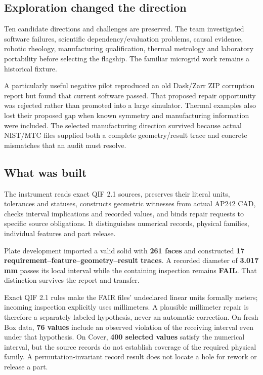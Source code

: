 \documentclass[
  10pt,
]{article}
\let\OriginalSubsection\subsection
\renewcommand{\subsection}{\needspace{6\baselineskip}\OriginalSubsection}
\begin{document}
\hypertarget{exploration-changed-the-direction}{%
\subsection{Exploration changed the
direction}\label{exploration-changed-the-direction}}

Ten candidate directions and challenges are preserved. The team
investigated software failures, scientific dependency/evaluation
problems, causal evidence, robotic rheology, manufacturing
qualification, thermal metrology and laboratory portability before
selecting the flagship. The familiar microgrid work remains a historical
fixture.

A particularly useful negative pilot reproduced an old Dask/Zarr ZIP
corruption report but found that current software passed. That proposed
repair opportunity was rejected rather than promoted into a large
simulator. Thermal examples also lost their proposed gap when known
symmetry and manufacturing information were included. The selected
manufacturing direction survived because actual NIST/MTC files supplied
both a complete geometry/result trace and concrete mismatches that an
audit must resolve.

\hypertarget{what-was-built}{%
\subsection{What was built}\label{what-was-built}}

The instrument reads exact QIF 2.1 sources, preserves their literal
units, tolerances and statuses, constructs geometric witnesses from
actual AP242 CAD, checks interval implications and recorded values, and
binds repair requests to specific source obligations. It distinguishes
numerical records, physical families, individual features and part
release.

Plate development imported a valid solid with \textbf{261 faces} and
constructed \textbf{17 requirement--feature--geometry--result traces}. A
recorded diameter of \textbf{3.017 mm} passes its local interval while
the containing inspection remains \textbf{FAIL}. That distinction
survives the report and transfer.

Exact QIF 2.1 rules make the FAIR files' undeclared linear units
formally meters; incoming inspection explicitly uses millimeters. A
plausible millimeter repair is therefore a separately labeled
hypothesis, never an automatic correction. On fresh Box data, \textbf{76
values} include an observed violation of the receiving interval even
under that hypothesis. On Cover, \textbf{400 selected values} satisfy
the numerical interval, but the source records do not establish coverage
of the required physical family. A permutation-invariant record result
does not locate a hole for rework or release a part.
\end{document}
